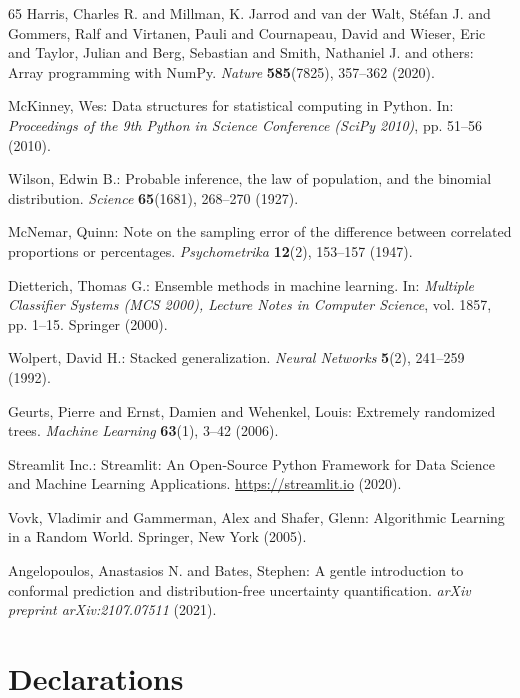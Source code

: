 \documentclass[pdflatex,sn-mathphys-num]{sn-jnl}%
\theoremstyle{thmstyleone}%
\theoremstyle{thmstyletwo}%
\theoremstyle{thmstylethree}%
\begin{document}
\begin{thebibliography}{65}
Harris, Charles R. and Millman, K. Jarrod and van der Walt, St{\'e}fan J. and Gommers, Ralf and Virtanen, Pauli and Cournapeau, David and Wieser, Eric and Taylor, Julian and Berg, Sebastian and Smith, Nathaniel J. and others: Array programming with NumPy.
\textit{Nature} \textbf{585}(7825), 357--362 (2020).

McKinney, Wes: Data structures for statistical computing in Python.
In: \textit{Proceedings of the 9th Python in Science Conference (SciPy 2010)}, pp. 51--56 (2010).

Wilson, Edwin B.: Probable inference, the law of population, and the binomial distribution.
\textit{Science} \textbf{65}(1681), 268--270 (1927).

McNemar, Quinn: Note on the sampling error of the difference between correlated proportions or percentages.
\textit{Psychometrika} \textbf{12}(2), 153--157 (1947).

Dietterich, Thomas G.: Ensemble methods in machine learning.
In: \textit{Multiple Classifier Systems (MCS 2000), Lecture Notes in Computer Science}, vol. 1857, pp. 1--15. Springer (2000).

Wolpert, David H.: Stacked generalization.
\textit{Neural Networks} \textbf{5}(2), 241--259 (1992).

Geurts, Pierre and Ernst, Damien and Wehenkel, Louis: Extremely randomized trees.
\textit{Machine Learning} \textbf{63}(1), 3--42 (2006).

Streamlit Inc.: Streamlit: An Open-Source Python Framework for Data Science and Machine Learning Applications.
\url{https://streamlit.io} (2020).

Vovk, Vladimir and Gammerman, Alex and Shafer, Glenn: Algorithmic Learning in a Random World.
Springer, New York (2005).

Angelopoulos, Anastasios N. and Bates, Stephen: A gentle introduction to conformal prediction and distribution-free uncertainty quantification.
\textit{arXiv preprint arXiv:2107.07511} (2021).

\end{thebibliography}
\section*{Declarations}
\end{document}

